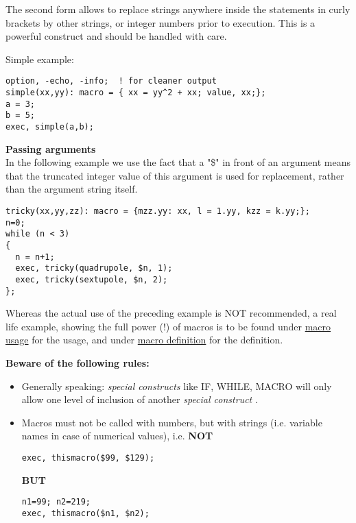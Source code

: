 The second form allows to replace strings anywhere inside the statements
in curly brackets by other strings, or integer numbers prior to
execution. This is a powerful construct and should be handled with care.  

Simple example: 
\begin{verbatim}
option, -echo, -info;  ! for cleaner output
simple(xx,yy): macro = { xx = yy^2 + xx; value, xx;};
a = 3;
b = 5;
exec, simple(a,b);
\end{verbatim}


{\bf Passing arguments}\\
In the following example we use the fact that a "\$" in front of an
argument means that the truncated integer value of this argument is used
for replacement, rather than the argument string itself.  
\begin{verbatim}
tricky(xx,yy,zz): macro = {mzz.yy: xx, l = 1.yy, kzz = k.yy;};
n=0;
while (n < 3)
{
  n = n+1;
  exec, tricky(quadrupole, $n, 1);
  exec, tricky(sextupole, $n, 2);
};
\end{verbatim} 
Whereas the actual use of the preceding example is NOT recommended,
a real life example, showing the full power (!) of macros is to be
found under \href{foot.html}{macro usage} for the usage, and
under \href{foot.html#macro}{macro definition} for the
definition.


{\bf Beware of the following rules:}
\begin{itemize}
   \item Generally speaking: \textit{ special constructs } like IF,
     WHILE, MACRO will only allow one level of inclusion of another
     \textit{ special construct }.
   \item  Macros must not be called with numbers, but with strings
     (i.e. variable names in case of numerical values), i.e. {\bf NOT }
\begin{verbatim}
exec, thismacro($99, $129);
\end{verbatim}
{\bf BUT}
\begin{verbatim}
n1=99; n2=219;
exec, thismacro($n1, $n2);
\end{verbatim}
\end{itemize}


